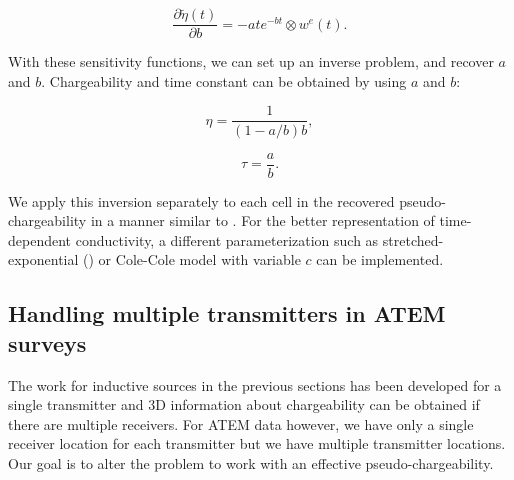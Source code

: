 \documentclass[extra,mreferee]{gji}
\newcommand{\peta}{\tilde{\eta}}
\begin{document}
\begin{linenomath*}
\begin{equation}
  \frac{\partial \peta(t)}{\partial b} = -ate^{-bt} \otimes w^e(t).
\end{equation}
\end{linenomath*}
With these sensitivity functions, we can set up an inverse problem, and recover $a$ and $b$. 
Chargeability and time constant can be obtained by using $a$ and $b$:
\begin{linenomath*}
\begin{equation}
  \eta =  \frac{1}{(1-a/b)b},
\end{equation}
\end{linenomath*}
\begin{linenomath*}
\begin{equation}
  \tau =  \frac{a}{b}.
\end{equation}
\end{linenomath*}
We apply this inversion separately to each cell in the recovered pseudo-chargeability  in a manner similar to \cite[]{Yuval1997}.
For the better representation of time-dependent conductivity, a different parameterization such as stretched-exponential (\cite{Kohlrausch1854}) or Cole-Cole model with variable $c$ can be implemented. 

\subsection{Handling multiple transmitters in ATEM surveys}
\label{subsection: Handling multiple transmitters in ATEM surveys}
The work for inductive sources in the previous sections has been developed for a single transmitter and  3D information about chargeability can be obtained if there are multiple receivers. For ATEM data however, we have only a single receiver location for each transmitter but we have multiple transmitter locations. 
Our goal is to alter the problem to work with an effective pseudo-chargeability. 
\end{document}
